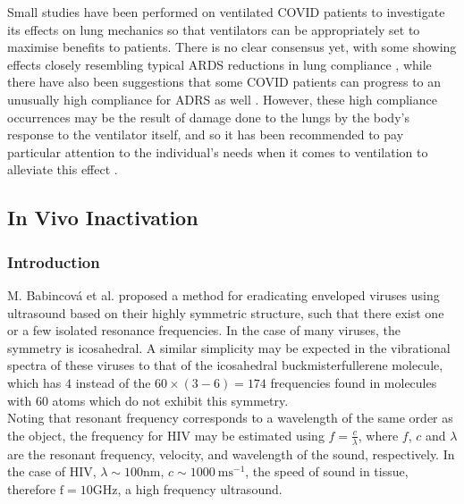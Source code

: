 \documentclass[11pt]{report}
\begin{document}
Small studies have been performed on ventilated COVID patients to investigate its effects on lung mechanics so that ventilators can be appropriately set to maximise benefits to patients. There is no clear consensus yet, with some showing effects closely resembling typical ARDS reductions in lung compliance \cite{vent5}, while there have also been suggestions that some COVID patients can progress to an unusually high compliance for ADRS as well \cite{vent6}. However, these high compliance occurrences may be the result of damage done to the lungs by the body’s response to the ventilator itself, and so it has been recommended to pay particular attention to the individual’s needs when it comes to ventilation to alleviate this effect \cite{vent7}.

			
			
			\subsection{In Vivo Inactivation}
			
				\subsubsection{Introduction}
			
				\noindent M. Babincová et al. proposed \cite{resonant} a method for eradicating enveloped viruses using ultrasound based on their highly symmetric structure, such that there exist one or a few isolated resonance frequencies. In the case of many viruses, the symmetry is icosahedral. A similar simplicity may be expected in the vibrational spectra of these viruses to that of the icosahedral buckmisterfullerene molecule, which has $4$ instead of the $60 \times (3 - 6) = 174$ frequencies found in molecules with 60 atoms which do not exhibit this symmetry. \\
			
				\noindent Noting that resonant frequency corresponds to a wavelength of the same order as the object, the frequency for HIV may be estimated using $f=\frac{c}{\lambda}$, where $f$, $c$ and $\lambda$ are the resonant frequency, velocity, and wavelength of the sound, respectively. In the case of HIV, $\lambda \sim 100 \mathrm{nm}$, $c \sim 1000 \mathrm{~ms}^{-1}$, the speed of sound in tissue, therefore $\mathrm{f}=10 \mathrm{GHz}$, a high frequency ultrasound. \\
			
\end{document}
